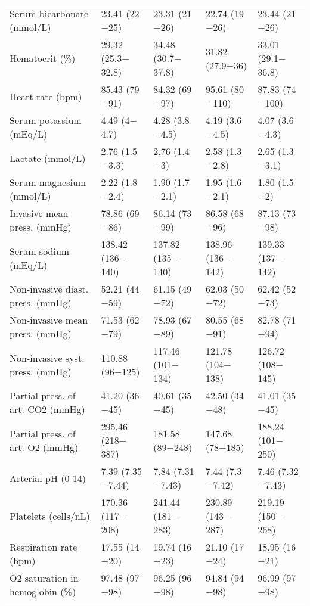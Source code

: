 \begin{table*} [ht!]
{\begin{tabular}{lllll}
Serum bicarbonate (mmol/L)  &  23.41 (22$-$25)  &  23.31 (21$-$26)  &  22.74 (19$-$26)  &  23.44 (21$-$26) \\
Hematocrit (\%)  &  29.32 (25.3$-$32.8)  &  34.48 (30.7$-$37.8)  &  31.82 (27.9$-$36)  &  33.01 (29.1$-$36.8) \\
Heart rate (bpm)  &  85.43 (79$-$91)  &  84.32 (69$-$97)  &  95.61 (80$-$110)  &  87.83 (74$-$100) \\
Serum potassium (mEq/L)  &  4.49 (4$-$4.7)  &  4.28 (3.8$-$4.5)  &  4.19 (3.6$-$4.5)  &  4.07 (3.6$-$4.3) \\
Lactate (mmol/L)  &  2.76 (1.5$-$3.3)  &  2.76 (1.4$-$3)  &  2.58 (1.3$-$2.8)  &  2.65 (1.3$-$3.1) \\
Serum magnesium (mmol/L)  &  2.22 (1.8$-$2.4)  &  1.90 (1.7$-$2.1)  &  1.95 (1.6$-$2.1)  &  1.80 (1.5$-$2) \\
Invasive mean press. (mmHg)  &  78.86 (69$-$86)  &  86.14 (73$-$99)  &  86.58 (68$-$96)  &  87.13 (73$-$98) \\
Serum sodium (mEq/L)  &  138.42 (136$-$140)  &  137.82 (135$-$140)  &  138.96 (136$-$142)  &  139.33 (137$-$142) \\
Non-invasive diast. press. (mmHg)  &  52.21 (44$-$59)  &  61.15 (49$-$72)  &  62.03 (50$-$72)  &  62.42 (52$-$73) \\
Non-invasive mean press. (mmHg)  &  71.53 (62$-$79)  &  78.93 (67$-$89)  &  80.55 (68$-$91)  &  82.78 (71$-$94) \\
Non-invasive syst. press. (mmHg)  &  110.88 (96$-$125)  &  117.46 (101$-$134)  &  121.78 (104$-$138)  &  126.72 (108$-$145) \\
Partial press. of art. CO2 (mmHg)  &  41.20 (36$-$45)  &  40.61 (35$-$45)  &  42.50 (34$-$48)  &  41.01 (35$-$45) \\
Partial press. of art. O2 (mmHg)  &  295.46 (218$-$387)  &  181.58 (89$-$248)  &  147.68 (78$-$185)  &  188.24 (101$-$250) \\
Arterial pH (0-14) &  7.39 (7.35$-$7.44)  &  7.84 (7.31$-$7.43)  &  7.44 (7.3$-$7.42)  &  7.46 (7.32$-$7.43) \\
Platelets (cells/nL)  &  170.36 (117$-$208)  &  241.44 (181$-$283)  &  230.89 (143$-$287)  &  219.19 (150$-$268) \\
Respiration rate (bpm)  &  17.55 (14$-$20)  &  19.74 (16$-$23)  &  21.10 (17$-$24)  &  18.95 (16$-$21) \\
O2 saturation in hemoglobin (\%)  &  97.48 (97$-$98)  &  96.25 (96$-$98)  &  94.84 (94$-$98)  &  96.99 (97$-$98) \\

\end{tabular}}
\end{table*}
